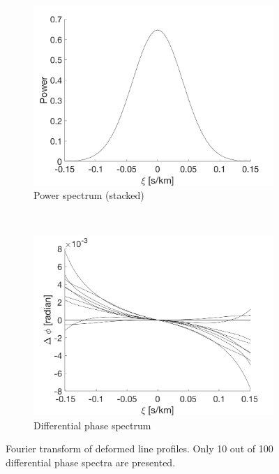 \begin{figure}[tbp]	
    \begin{subfigure}[b]{0.49\textwidth}
        \includegraphics[width=\textwidth]{./Figures/Methods/LPD2-FT_power.png}
        \caption{Power spectrum (stacked)}
    \end{subfigure}
	~
    \begin{subfigure}[b]{0.49\textwidth}
        \includegraphics[width=\textwidth]{./Figures/Methods/LPD4-Relative_phase_angle.png}
        \caption{Differential phase spectrum}
        \label{fig:dps_LPD}
    \end{subfigure}	
    
    \caption[Fourier transform of deformed line profiles]
    {Fourier transform of deformed line profiles. Only 10 out of 100 differential phase spectra are presented.}
\label{fig:FT_process_LPD}
\end{figure}    

